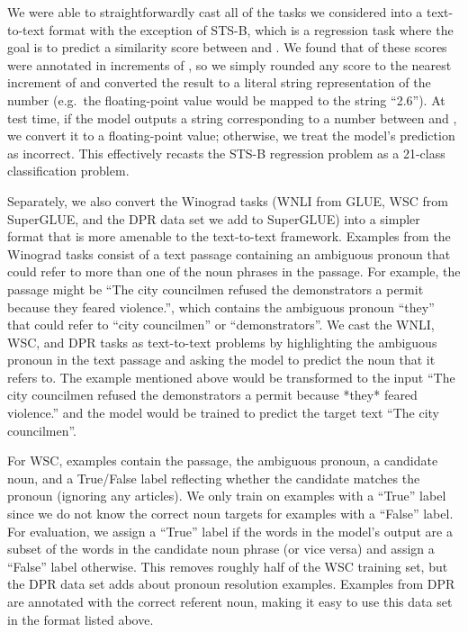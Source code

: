 \documentclass[twoside,11pt]{article}
\begin{document}
We were able to straightforwardly cast all of the tasks we considered into a text-to-text format with the exception of STS-B, which is a regression task where the goal is to predict a similarity score between  and .
We found that  of these scores were annotated in increments of , so we simply rounded any score to the nearest increment of  and converted the result to a literal string representation of the number (e.g.\ the floating-point value  would be mapped to the string ``2.6'').
At test time, if the model outputs a string corresponding to a number between  and , we convert it to a floating-point value; otherwise, we treat the model's prediction as incorrect.
This effectively recasts the STS-B regression problem as a 21-class classification problem.

Separately, we also convert the Winograd tasks (WNLI from GLUE, WSC from SuperGLUE, and the DPR data set we add to SuperGLUE) into a simpler format that is more amenable to the text-to-text framework.
Examples from the Winograd tasks consist of a text passage containing an ambiguous pronoun that could refer to more than one of the noun phrases in the passage.
For example, the passage might be ``The city councilmen refused the demonstrators a permit because they feared violence.'', which contains the ambiguous pronoun ``they'' that could refer to ``city councilmen'' or ``demonstrators''.
We cast the WNLI, WSC, and DPR tasks as text-to-text problems by highlighting the ambiguous pronoun in the text passage and asking the model to predict the noun that it refers to.
The example mentioned above would be transformed to the input ``The city councilmen refused the demonstrators a permit because *they* feared violence.'' and the model would be trained to predict the target text ``The city councilmen''.

For WSC, examples contain the passage, the ambiguous pronoun, a candidate noun, and a True/False label reflecting whether the candidate matches the pronoun (ignoring any articles).
We only train on examples with a ``True'' label since we do not know the correct noun targets for examples with a ``False'' label.
For evaluation, we assign a ``True'' label if the words in the model's output are a subset of the words in the candidate noun phrase (or vice versa) and assign a ``False'' label otherwise.
This removes roughly half of the WSC training set, but the DPR data set adds about  pronoun resolution examples.
Examples from DPR are annotated with the correct referent noun, making it easy to use this data set in the format listed above.
\end{document}

